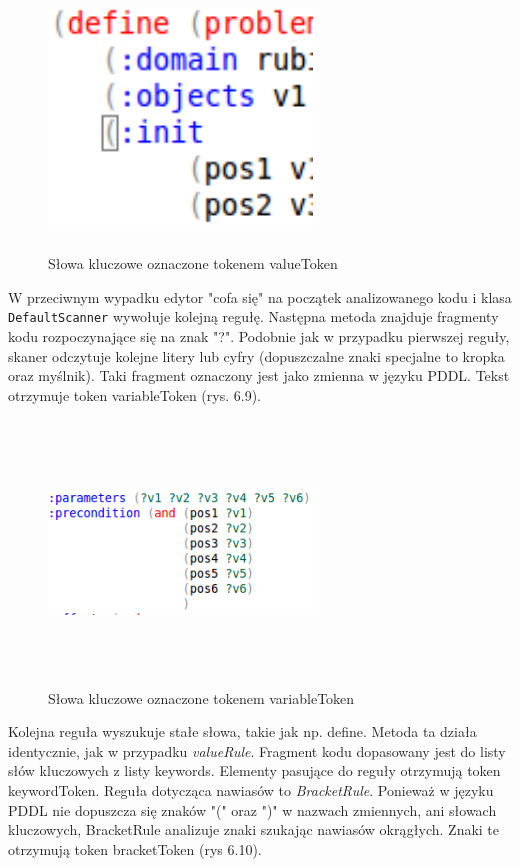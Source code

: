 \begin{figure}[h]
  \centering
    \includegraphics[width=7cm,height=7cm,keepaspectratio]{img/values-color.png}
    \caption{Słowa kluczowe oznaczone tokenem valueToken}
    \label{ana_structure}
\end{figure}

 W przeciwnym wypadku edytor "cofa się" na początek analizowanego kodu i klasa \texttt{DefaultScanner} wywołuje kolejną regułę. Następna metoda znajduje fragmenty kodu rozpoczynające się na znak "?".  Podobnie jak w przypadku pierwszej reguły, skaner odczytuje kolejne litery lub cyfry (dopuszczalne znaki specjalne to kropka oraz myślnik). Taki fragment oznaczony jest jako zmienna w języku PDDL. Tekst otrzymuje token variableToken (rys. 6.9).

\begin{figure}[h]
  \centering
    \includegraphics[width=7cm,height=7cm,keepaspectratio]{img/variable-color.png}
    \caption{Słowa kluczowe oznaczone tokenem variableToken}
    \label{ana_structure}
\end{figure}

Kolejna reguła wyszukuje stałe słowa, takie jak np. define. Metoda ta działa identycznie, jak w przypadku \emph{valueRule}. Fragment kodu dopasowany jest do listy słów kluczowych z listy keywords. Elementy pasujące do reguły otrzymują token keywordToken. Reguła dotycząca nawiasów to \emph{BracketRule}. Ponieważ w języku PDDL nie dopuszcza się znaków "(" oraz ")" w nazwach zmiennych, ani słowach kluczowych, BracketRule analizuje znaki szukając nawiasów okrągłych. Znaki te otrzymują token bracketToken (rys 6.10).


